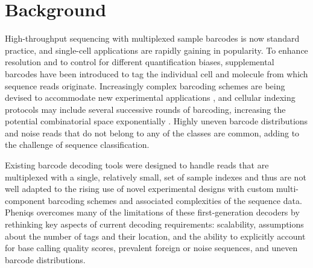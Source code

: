 \documentclass[twocolumn]{bmcart}
\begin{document}

\section*{Background}

High-throughput sequencing with multiplexed sample barcodes is now standard practice, and single-cell applications are rapidly gaining in popularity. To enhance resolution and to control for different quantification biases, supplemental barcodes have been introduced to tag the individual cell and molecule from which sequence reads originate. Increasingly complex barcoding schemes are being devised to accommodate new experimental applications \cite{doi:10.1038/s41576-019-0093-7}, and cellular indexing protocols may include several successive rounds of barcoding, increasing the potential combinatorial space exponentially \cite{doi:10.1126/science.aam8940}. Highly uneven barcode distributions and noise reads that do not belong to any of the classes are common, adding to the challenge of sequence classification.

Existing barcode decoding tools were designed to handle reads that are multiplexed with a single, relatively small, set of sample indexes and thus are not well adapted to the rising use of novel experimental designs with custom multi-component barcoding schemes and associated complexities of the sequence data. Pheniqs overcomes many of the limitations of these first-generation decoders by rethinking key aspects of current decoding requirements: scalability, assumptions about the number of tags and their location, and the ability to explicitly account for base calling quality scores, prevalent foreign or noise sequences, and uneven barcode distributions.
\end{document}
